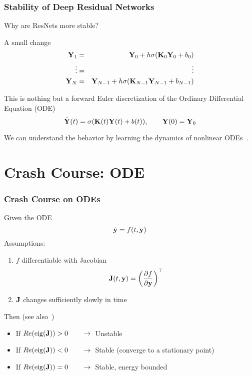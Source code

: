 \documentclass[12pt,fleqn,handout]{beamer}
\begin{document}
\begin{frame}[fragile]\frametitle{Stability of Deep Residual Networks}

Why are ResNets more stable?

A small change
\begin{eqnarray*}
{\bf Y}_1 &=& {\bf Y}_0 + h \sigma({\bf K}_0 {\bf Y}_0  + b_0) \\
\vdots &=& \vdots \\
 {\bf Y}_N &=& {\bf Y}_{N-1} + h\sigma({\bf K}_{N-1} {\bf Y}_{N-1} + b_{N-1})
 \end{eqnarray*}

\bigskip
\pause 

This is nothing but a forward Euler discretization
of the  Ordinary Differential Equation (ODE)
$$ \dot{{\bf Y}}(t) = \sigma({\bf K}(t) {\bf Y}(t)  + b(t)), \quad \quad {\bf Y}(0) = {\bf Y}_0 $$

We can understand the behavior by learning the dynamics of nonlinear ODEs~\cite{HaberRuthotto2017,E2017}.

\end{frame}


\section{Crash Course: ODE} %
\label{sec:crash_course_ode}
\begin{frame}[fragile]\frametitle{Crash Course on ODEs}

Given the ODE
$$ \dot{{\bf y}} = f(t,{\bf y}) $$
Assumptions:
\begin{enumerate}
	\item $f$ differentiable with Jacobian
$$ {\bf J}(t,{\bf y}) = \left({\frac {\partial f}{\partial {\bf y}}}\right)^\top$$
	\item ${\bf J}$ changes sufficiently slowly in time 
\end{enumerate} 


Then (see also~\cite{AscherPetzold1998,AscherGreif2011,Ascher2010})
\begin{itemize}
\item If $Re({\rm eig}({\bf J})) > 0\quad \quad \rightarrow$\ Unstable
\item If $Re({\rm eig}({\bf J})) < 0\quad \quad \rightarrow$\ Stable (converge to a stationary point)
\item If $Re({\rm eig}({\bf J})) = 0\quad \quad \rightarrow$\ Stable, energy bounded
\end{itemize}


\end{frame}
\end{document}
